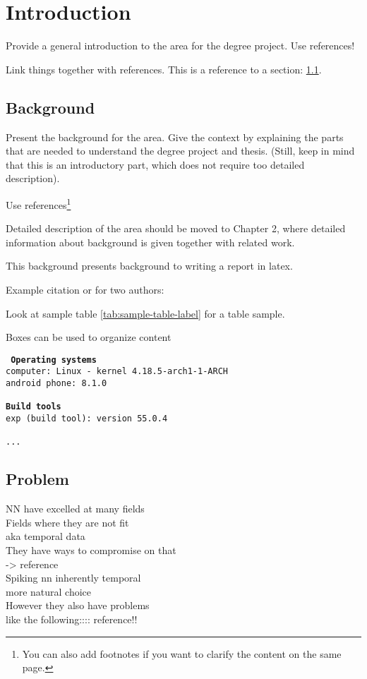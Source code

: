 \chapter{Introduction}

Provide a general introduction to the area for the degree project. Use references!

Link things together with references. This is a reference to a section: \ref{sec:background}.

\section{Background}
\label{sec:background}
Present the background for the area. Give the context by explaining the parts that are needed to understand the degree project and thesis. (Still, keep in mind that this is an introductory part, which does not require too detailed description).

Use references\footnote{You can also add footnotes if you want to clarify the content on the same page.}

Detailed description of the area should be moved to Chapter 2, where detailed information about background is given together with related work.

This background presents background to writing a report in latex.


Example citation \cite{Jones2017} or for two authors: \cite{Jones2017, Liu2017}

Look at sample table \ref{tab:sample-table-label} for a table sample.



Boxes can be used to organize content

\begin{tcolorbox}[title={Development environment for prototype}]
	\tt{
		\textbf{Operating systems }\\
		computer: Linux - kernel 4.18.5-arch1-1-ARCH\\
		android phone: 8.1.0\\
		~\\
		\textbf{Build tools}\\
		exp (build tool): version 55.0.4\\
		~\\
		...
	}
\end{tcolorbox}

\section{Problem}
NN have excelled at many fields\\
Fields where they are not fit\\ aka temporal data\\
They have ways to compromise on that \\ -> reference\\
Spiking nn inherently temporal \\
more natural choice\\
However they also have problems\\
like the following:::: reference!!\\
